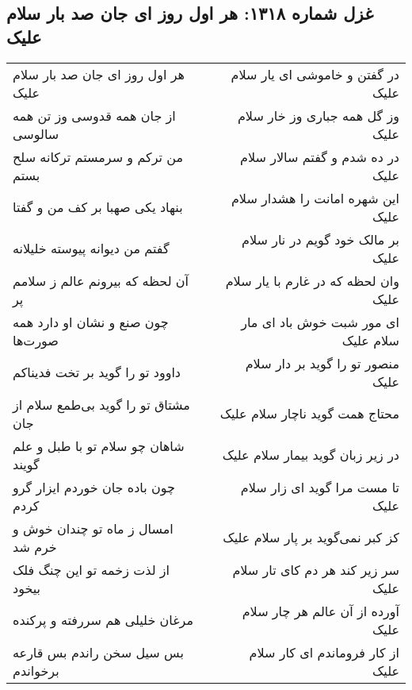 \begin{center}
\section*{غزل شماره ۱۳۱۸: هر اول روز ای جان صد بار سلام علیک}
\label{sec:1318}
\begin{longtable}{l p{0.5cm} r}
هر اول روز ای جان صد بار سلام علیک
&&
در گفتن و خاموشی ای یار سلام علیک
\\
از جان همه قدوسی وز تن همه سالوسی
&&
وز گل همه جباری وز خار سلام علیک
\\
من ترکم و سرمستم ترکانه سلح بستم
&&
در ده شدم و گفتم سالار سلام علیک
\\
بنهاد یکی صهبا بر کف من و گفتا
&&
این شهره امانت را هشدار سلام علیک
\\
گفتم من دیوانه پیوسته خلیلانه
&&
بر مالک خود گویم در نار سلام علیک
\\
آن لحظه که بیرونم عالم ز سلامم پر
&&
وان لحظه که در غارم با یار سلام علیک
\\
چون صنع و نشان او دارد همه صورت‌ها
&&
ای مور شبت خوش باد ای مار سلام علیک
\\
داوود تو را گوید بر تخت فدیناکم
&&
منصور تو را گوید بر دار سلام علیک
\\
مشتاق تو را گوید بی‌طمع سلام از جان
&&
محتاج همت گوید ناچار سلام علیک
\\
شاهان چو سلام تو با طبل و علم گویند
&&
در زیر زبان گوید بیمار سلام علیک
\\
چون باده جان خوردم ایزار گرو کردم
&&
تا مست مرا گوید ای زار سلام علیک
\\
امسال ز ماه تو چندان خوش و خرم شد
&&
کز کبر نمی‌گوید بر پار سلام علیک
\\
از لذت زخمه تو این چنگ فلک بیخود
&&
سر زیر کند هر دم کای تار سلام علیک
\\
مرغان خلیلی هم سررفته و پرکنده
&&
آورده از آن عالم هر چار سلام علیک
\\
بس سیل سخن راندم بس قارعه برخواندم
&&
از کار فروماندم ای کار سلام علیک
\\
\end{longtable}
\end{center}
